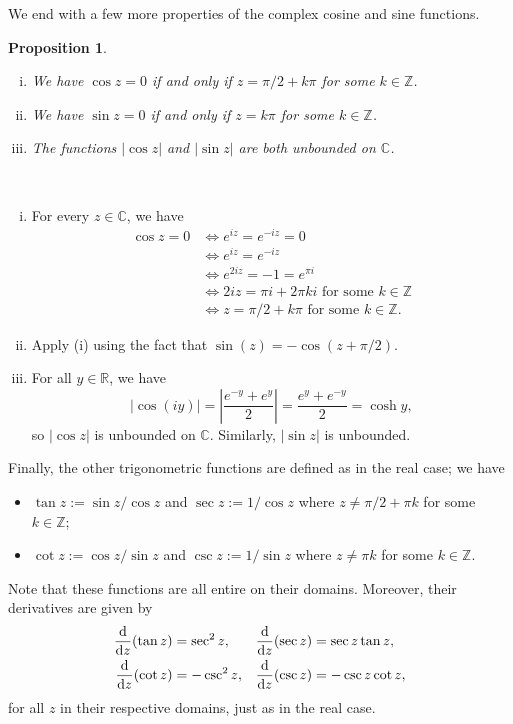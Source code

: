 \documentclass[10pt]{article}
\makeatletter
\newcommand{\R}{\mathbb{R}}
\newcommand{\C}{\mathbb{C}}
\newcommand{\Z}{\mathbb{Z}}
\theoremstyle{newstyle}
\newtheorem{prop}[thm]{Proposition}
\newenvironment{pf}[1][\proofname]{\par
  \pushQED{\qed}%
  \normalfont \topsep0\p@\relax
  \trivlist
  \item[\hskip\labelsep\scshape
  #1\@addpunct{.}]\ignorespaces
}{%
  \popQED\endtrivlist\@endpefalse
}
\makeatother
\begin{document}
We end with a few more properties of the complex cosine and sine functions. 

\begin{prop}~
\begin{enumerate}[(i)]
    \item We have $\cos z = 0$ if and only if $z = \pi/2 + k\pi$ for some $k \in \Z$.
    \item We have $\sin z = 0$ if and only if $z = k\pi$ for some $k \in \Z$.
    \item The functions $\lvert\cos z\rvert$ and $\lvert\sin z\rvert$ are both unbounded on $\C$. 
\end{enumerate}
\end{prop}
\begin{pf}~
\begin{enumerate}[(i)]
    \item For every $z \in \C$, we have 
    \begin{align*}
        \cos z = 0 &\iff e^{iz} = e^{-iz} = 0 \\
        &\iff e^{iz} = e^{-iz} \\
        &\iff e^{2iz} = -1 = e^{\pi i} \\
        &\iff 2iz = \pi i + 2\pi ki \text{ for some } k \in \Z \\
        &\iff z = \pi/2 + k\pi \text{ for some } k \in \Z.
    \end{align*}
    \item Apply (i) using the fact that $\sin(z) = -\cos(z + \pi/2)$. 
    \item For all $y \in \R$, we have 
    \[ \lvert\cos(iy)\rvert = \left| \frac{e^{-y} + e^y}2 \right| = \frac{e^y + e^{-y}}2 = \cosh y, \]
    so $\lvert\cos z\rvert$ is unbounded on $\C$. Similarly, $\lvert\sin z\rvert$ is unbounded. \qedhere
\end{enumerate}
\end{pf}

Finally, the other trigonometric functions are defined as in the real case; we have 
\begin{itemize}
    \item $\tan z := \sin z / \cos z$ and $\sec z := 1/\cos z$ where $z \neq \pi/2 + \pi k$ for some 
    $k \in \Z$;
    \item $\cot z := \cos z / \sin z$ and $\csc z := 1/\sin z$ where $z \neq \pi k$ for some $k \in \Z$.
\end{itemize}
Note that these functions are all entire on their domains. Moreover, their derivatives are given by 
\begin{align*}
    \frac{\rm d}{{\rm d}z}(\tan z) &= \sec^2 z, & \frac{\rm d}{{\rm d}z} (\sec z) &= \sec z \tan z, \\
    \frac{\rm d}{{\rm d}z}(\cot z) &= -\csc^2 z, & \frac{\rm d}{{\rm d}z} (\csc z) &= -\csc z \cot z,
\end{align*}
for all $z$ in their respective domains, just as in the real case. 
\end{document}
